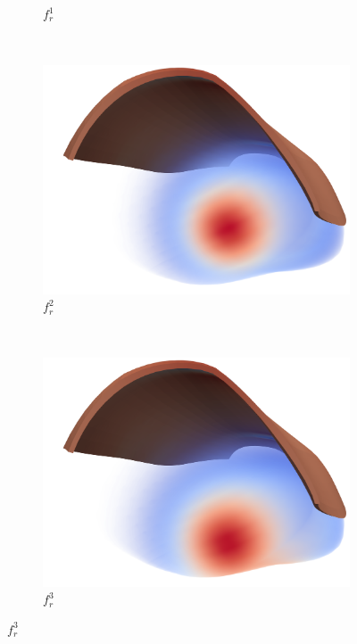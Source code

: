 \begin{figure}[H]
\begin{subfigure}[t]{0.23\textwidth}
    \caption{$f_r^1$}%
    \label{fig:fr1}%
  \end{subfigure}
  \,
  \begin{subfigure}[t]{0.23\textwidth}%
    \centering%
    \includegraphics[width=\textwidth]{images/results/application/multidomain_fr2_cropped.png}%
    \caption{$f_r^2$}%
    \label{fig:fr2}%
  \end{subfigure}
  \,
  \begin{subfigure}[t]{0.23\textwidth}%
    \centering%
    \includegraphics[width=\textwidth]{images/results/application/multidomain_fr3_cropped.png}%
    \caption{$f_r^3$}%
    \label{fig:fr3}%
  \end{subfigure}
\end{figure}%


